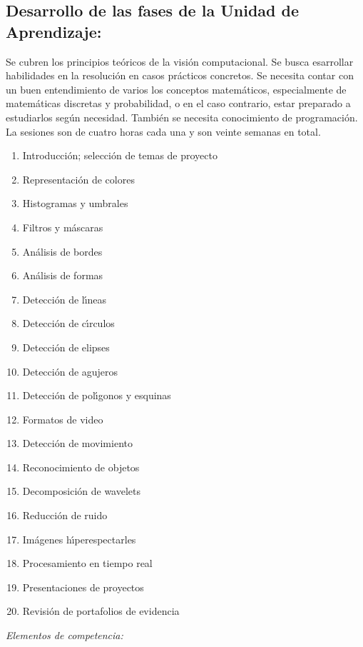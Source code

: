 \documentclass[10 pt]{article}
\begin{document}
\subsection{Desarrollo de las fases de la Unidad de Aprendizaje:}

Se cubren los principios te\'{o}ricos de la visi\'{o}n computacional.  Se
busca esarrollar habilidades en la resoluci\'{o}n en casos
pr\'{a}cticos concretos. Se necesita contar con un buen entendimiento
de varios los conceptos matem\'{a}ticos, especialmente de
matem\'{a}ticas discretas y probabilidad, o en el caso contrario,
estar preparado a estudiarlos seg\'{u}n necesidad. Tambi\'{e}n se
necesita conocimiento de programaci\'{o}n.  La sesiones son de cuatro
horas cada una y son veinte semanas en total.
\begin{enumerate}[itemsep=-3pt]
\item{Introducci\'{o}n; selecci\'{o}n de temas de proyecto}
\item{Representaci\'{o}n de colores}
\item{Histogramas y umbrales}
\item{Filtros y m\'{a}scaras}
\item{An\'{a}lisis de bordes}
\item{An\'{a}lisis de formas}
\item{Detecci\'{o}n de l\'{\i}neas}
\item{Detecci\'{o}n de c\'{\i}rculos}
\item{Detecci\'{o}n de elipses}
\item{Detecci\'{o}n de agujeros}
\item{Detecci\'{o}n de pol\'{\i}gonos y esquinas}
\item{Formatos de video}
\item{Detecci\'{o}n de movimiento}
\item{Reconocimiento de objetos}
\item{Decomposici\'{o}n de wavelets}
\item{Reducci\'{o}n de ruido}
\item{Im\'{a}genes h\'{\i}perespectarles}
\item{Procesamiento en tiempo real}
\item{Presentaciones de proyectos}
\item{Revisi\'{o}n de portafolios de evidencia}
\end{enumerate}

{\em Elementos de competencia:}
\end{document}
